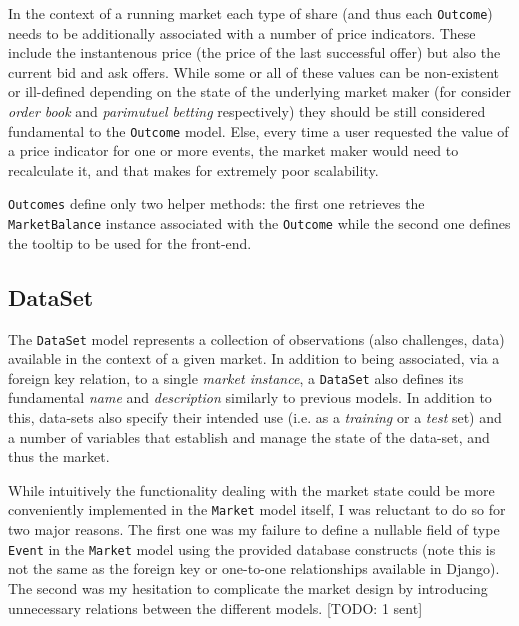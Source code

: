 \documentclass[bsc,frontabs,twoside,singlespacing,parskip,deptreport]{infthesis}     %
\begin{document}
	In the context of a running market each type of share (and thus each {\tt Outcome}) needs to be additionally associated with a number of price indicators. These include the instantenous price (the price of the last successful offer) but also the current bid and ask offers. While some or all of these values can be non-existent or ill-defined depending on the state of the underlying market maker (for consider {\em order book} and {\em parimutuel betting} respectively) they should be still considered fundamental to the {\tt Outcome} model. Else, every time a user requested the value of a price indicator for one or more events, the market maker would need to recalculate it, and that makes for extremely poor scalability. 

	{\tt Outcomes} define only two helper methods: the first one retrieves the {\tt MarketBalance} instance associated with the {\tt Outcome} while the second one defines the tooltip to be used for the front-end. 

\subsection{DataSet}

	The {\tt DataSet} model represents a collection of observations (also challenges, data) available in the context of a given market. In addition to being associated, via a foreign key relation, to a single {\it market instance}, a {\tt DataSet} also defines its fundamental {\it name} and {\it description} similarly to previous models. In addition to this, data-sets also specify their intended use (i.e. as a {\it training} or a {\it test} set) and a number of variables that establish and manage the state of the data-set, and thus the market.
	
	While intuitively the functionality dealing with the market state could be more conveniently implemented in the {\tt Market} model itself, I was reluctant to do so for two major reasons. The first one was my failure to define a nullable field of type {\tt Event} in the {\tt Market} model using the provided database constructs (note this is not the same as the foreign key or one-to-one relationships available in Django). The second was my hesitation to complicate the market design by introducing unnecessary relations between the different models. [TODO: 1 sent]
\end{document}
